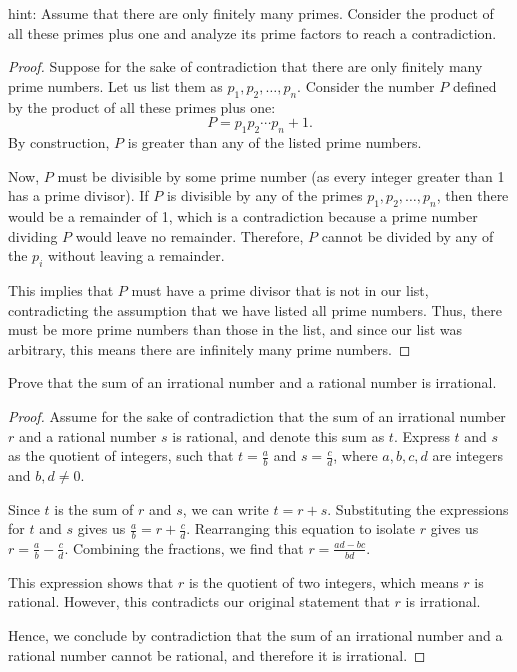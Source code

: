 \documentclass[
	12pt, %
	fleqn, %
	a4paper, %
]{LegrandOrangeBook}
\begin{document}
hint: Assume that there are only finitely many primes. Consider the product of all these primes plus one and analyze its prime factors to reach a contradiction.


\begin{proof}
Suppose for the sake of contradiction that there are only finitely many prime numbers. Let us list them as \( p_1, p_2, \ldots, p_n \). Consider the number \( P \) defined by the product of all these primes plus one:
\[ P = p_1p_2 \cdots p_n + 1. \]
By construction, \( P \) is greater than any of the listed prime numbers. 

Now, \( P \) must be divisible by some prime number (as every integer greater than 1 has a prime divisor). If \( P \) is divisible by any of the primes \( p_1, p_2, \ldots, p_n \), then there would be a remainder of 1, which is a contradiction because a prime number dividing \( P \) would leave no remainder. Therefore, \( P \) cannot be divided by any of the \( p_i \) without leaving a remainder. 

This implies that \( P \) must have a prime divisor that is not in our list, contradicting the assumption that we have listed all prime numbers. Thus, there must be more prime numbers than those in the list, and since our list was arbitrary, this means there are infinitely many prime numbers.
\end{proof}
\begin{exercise}
Prove that the sum of an irrational number and a rational number is irrational.
\end{exercise}

\begin{proof}
Assume for the sake of contradiction that the sum of an irrational number \( r \) and a rational number \( s \) is rational, and denote this sum as \( t \). Express \( t \) and \( s \) as the quotient of integers, such that \( t = \frac{a}{b} \) and \( s = \frac{c}{d} \), where \( a, b, c, d \) are integers and \( b, d \neq 0 \).

Since \( t \) is the sum of \( r \) and \( s \), we can write \( t = r + s \). Substituting the expressions for \( t \) and \( s \) gives us \( \frac{a}{b} = r + \frac{c}{d} \). Rearranging this equation to isolate \( r \) gives us \( r = \frac{a}{b} - \frac{c}{d} \). Combining the fractions, we find that \( r = \frac{ad - bc}{bd} \).

This expression shows that \( r \) is the quotient of two integers, which means \( r \) is rational. However, this contradicts our original statement that \( r \) is irrational.

Hence, we conclude by contradiction that the sum of an irrational number and a rational number cannot be rational, and therefore it is irrational.
\end{proof}
\end{document}
